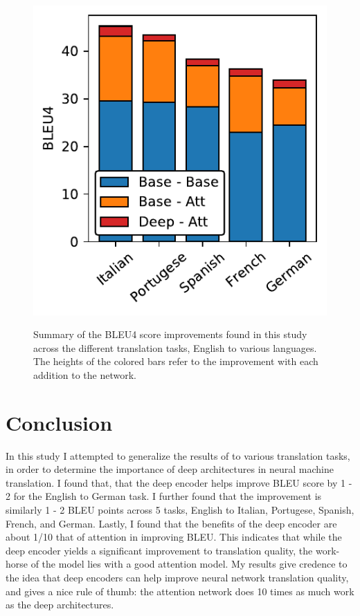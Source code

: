 \documentclass[twocolumn,superscriptaddress]{revtex4-1}
\begin{document}
\begin{figure}
\includegraphics{../plots/barplot.pdf}
\label{fig:table}
\caption{
Summary of the BLEU4 score improvements found in this study across the different translation tasks, English to various languages.
The heights of the colored bars refer to the improvement with each addition to the network.
}
\end{figure}

\section{Conclusion}
In this study I attempted to generalize the results of \cite{miceli-barone-etal-2017-deep} to various translation tasks, in order to determine the importance of deep architectures in neural machine translation.
I found that, that the deep encoder helps improve BLEU score by 1 - 2 for the English to German task.
I further found that the improvement is similarly 1 - 2 BLEU points across 5 tasks, English to Italian, Portugese, Spanish, French, and German.
Lastly, I found that the benefits of the deep encoder are about 1/10 that of attention in improving BLEU.
This indicates that while the deep encoder yields a significant improvement to translation quality, the work-horse of the model lies with a good attention model.
My results give credence to the idea that deep encoders can help improve neural network translation quality, and gives a nice rule of thumb: the attention network does 10 times as much work as the deep architectures.


\end{document}
